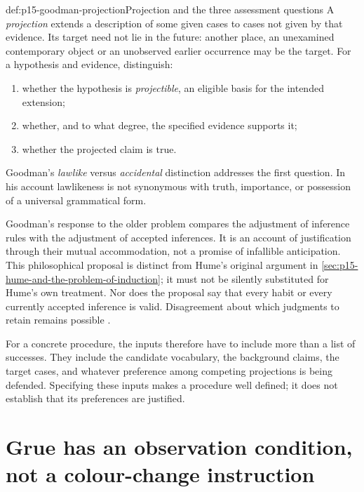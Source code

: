 \begin{hbdefinition}{def:p15-goodman-projection}{Projection and the three assessment questions}
A \emph{projection} extends a description of some given cases to cases not
given by that evidence. Its target need not lie in the future: another place,
an unexamined contemporary object or an unobserved earlier occurrence may
be the target. For a hypothesis and evidence, distinguish:

\begin{enumerate}
\item whether the hypothesis is \emph{projectible}, an eligible basis for the
intended extension;
\item whether, and to what degree, the specified evidence supports it;
\item whether the projected claim is true.
\end{enumerate}

Goodman's \emph{lawlike} versus \emph{accidental} distinction addresses the
first question. In his account lawlikeness is not synonymous with truth,
importance, or possession of a universal grammatical form.
\end{hbdefinition}

Goodman's response to the older problem compares the adjustment of
inference rules with the adjustment of accepted inferences. It is an account
of justification through their mutual accommodation, not a promise of
infallible anticipation. This philosophical proposal is distinct from
Hume's original argument in
\cref{sec:p15-hume-and-the-problem-of-induction}; it must not be silently
substituted for Hume's own treatment. Nor does the proposal say that every
habit or every currently accepted inference is valid. Disagreement about
which judgments to retain remains possible
\parencite[III, \S\S1--2]{GoodmanNewRiddleTeachingScan}.

For a concrete procedure, the inputs therefore have to include more than
a list of successes. They include the candidate vocabulary, the background
claims, the target cases, and whatever preference among competing
projections is being defended. Specifying these inputs makes a procedure
well defined; it does not establish that its preferences are justified.

\section{Grue has an observation condition, not a colour-change instruction}
\label{sec:p15-goodman-grue}

